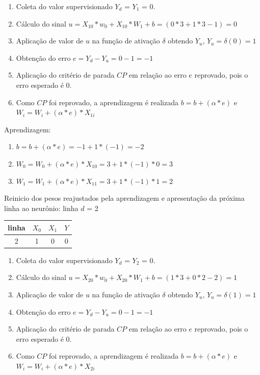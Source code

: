 \documentclass[	12pt, Times, openright, twoside, a4paper, english, brazil]{abntex2}
\begin{document}
    				
    				\begin{enumerate}
    				    \item Coleta do valor supervisionado $Y_d$ = $Y_1$ = 0.
    					\item Cálculo do sinal $u = X_{10}*w_0 + X_{10}*W_1 +b = (0*3 + 1*3 -1) = 0$
    					\item Aplicação de valor de $u$ na função de ativação $\delta$ obtendo $Y_u$, $Y_u = \delta(0) = 1$
    					\item Obtenção do erro $e = Y_d-Y_u = 0 - 1 = -1$
    					\item Aplicação do critério de parada $CP$ em relação ao erro $e$ reprovado, pois o erro esperado é 0.
    					\item Como $CP$ foi reprovado, a aprendizagem é realizada $b=b+(\alpha*e)$ e $W_i=W_i + (\alpha*e)*X_{1i}$
    				\end{enumerate}
    				
    				Aprendizagem:
    				\begin{enumerate}
    					\item $b=b+(\alpha*e) = -1 + 1*(-1) = -2 $  					
    					\item $W_0=W_0 + (\alpha*e)*X_{10} = 3 + 1*(-1)*0 = 3$ 
    					\item $W_1=W_1 + (\alpha*e)*X_{11} = 3 + 1*(-1)*1 = 2$
    				\end{enumerate}
    				
    				Reinicio dos pesos reajustados pela aprendizagem e apresentação da próxima linha ao neurônio:
    				linha $d$ = 2\\
    				\begin{table}[!ht]
                    \centering
    				\begin{tabular}{|c|c|c|c|}
    					\hline  \textbf{linha} & \textbf{$X_0$} & \textbf{$X_1$} &  \textbf{$Y$}\\
  				 	    \hline 2 & 1 & 0 & 0\\
    				\end{tabular}
    				\end{table}
            	
            	
            	\begin{enumerate}
            	    \item Coleta do valor supervisionado $Y_d$ = $Y_2$ = 0.
            		\item Cálculo do sinal $u = X_{20}*w_0 + X_{20}*W_1 +b = (1*3 + 0*2 -2) = 1$
            		\item Aplicação de valor de $u$ na função de ativação $\delta$ obtendo $Y_u$, $Y_u = \delta(1) = 1$
            		\item Obtenção do erro $e = Y_d-Y_u = 0 - 1 = -1$
            		\item Aplicação do critério de parada $CP$ em relação ao erro $e$ reprovado, pois o erro esperado é 0.
    				\item Como $CP$ foi reprovado, a aprendizagem é realizada $b=b+(\alpha*e)$ e $W_i=W_i + (\alpha*e)*X_{2i}$
            	\end{enumerate}
            
\end{document}
